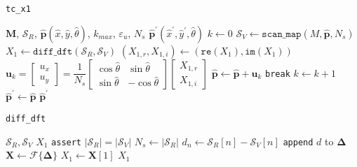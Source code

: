 \begin{algorithm}[!h]
  \caption{\texttt{tc\_x1}}
  \begin{spacing}{1.4}
    \begin{algorithmic}[1]
      \REQUIRE $\bm{M}$, $\mathcal{S}_R$, $\hat{\bm{p}}(\hat{x}, \hat{y}, \hat{\theta})$, $k_{max}$, $\varepsilon_u$, $N_s$
      \ENSURE $\hat{\bm{p}}^\prime(\hat{x}^{\prime}, \hat{y}^{\prime}, \hat{\theta})$
      \STATE $k \leftarrow 0$
      \STATE $\mathcal{S}_V \leftarrow \texttt{scan\_map}(M, \hat{\bm{p}}, N_s)$
      \STATE $X_1 \leftarrow \texttt{diff\_dft}(\mathcal{S}_R, \mathcal{S}_V)$
      \STATE $(X_{1,r}, X_{1,i}) \leftarrow (\texttt{re}(X_1), \texttt{im}(X_1))$
      \STATE $\bm{u}_k = \begin{bmatrix}
              u_x \\ u_y
             \end{bmatrix}
             =
             \dfrac{1}{N_s}
             \begin{bmatrix}
               \cos\hat{\theta} & \sin\hat{\theta} \\
               \sin\hat{\theta} & -\cos\hat{\theta}
             \end{bmatrix}
             \begin{bmatrix}
               X_{1,r} \\ X_{1,i}
             \end{bmatrix}
             $
      \STATE $\hat{\bm{p}}\leftarrow \hat{\bm{p}}+ \bm{u}_k$
        \STATE \texttt{break}
      \ENDIF
      \STATE $k \leftarrow k + 1$
      \ENDWHILE
      \STATE $\hat{\bm{p}}^\prime \leftarrow \hat{\bm{p}}$
      \RETURN $\hat{\bm{p}}^\prime$
    \end{algorithmic}
  \end{spacing}
  \label{alg:icte}
\end{algorithm}

\begin{algorithm}[!h]
  \caption{\texttt{diff\_dft}}
  \begin{spacing}{1.3}
    \begin{algorithmic}[1]
      \REQUIRE $\mathcal{S}_R, \mathcal{S}_V$
      \ENSURE $X_1$
      \STATE \texttt{assert} $|\mathcal{S}_R| = |\mathcal{S}_V|$
      \STATE $N_s \leftarrow |\mathcal{S}_R|$
      \STATE {$\bm{\Delta} \leftarrow \{\varnothing\}$}
      \STATE $d_n \leftarrow \mathcal{S}_R[n] - \mathcal{S}_V[n]$
      \STATE \texttt{append} $d$ to $\bm{\Delta}$
      \ENDFOR
      \STATE $\bm{X} \leftarrow \mathcal{F}\{\bm{\Delta}\}$
      \STATE $X_1 \leftarrow \bm{X}[1]$
      \RETURN $X_1$
    \end{algorithmic}
  \end{spacing}
  \label{alg:diff_dft}
\end{algorithm}


